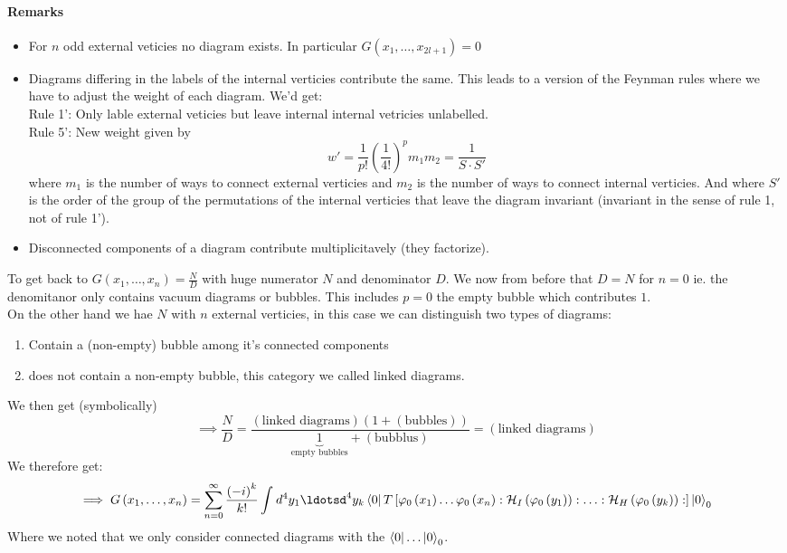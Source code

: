 \documentclass{report}
\begin{document}
\paragraph{Remarks}
\begin{itemize}
  \item For $n$ odd external veticies no diagram exists. In particular $G\left( x_1,\ldots,x_{2l+1}  \right) = 0$ 
  \item Diagrams differing in the labels of the internal verticies contribute the same. This leads to a version of the Feynman rules where we have to adjust the weight of each diagram. We'd get:\\
    Rule 1': Only lable external veticies but leave internal internal vetricies unlabelled.\\
    Rule 5': New weight given by \[
    w' = \frac{1}{p!} \left( \frac{1}{4!} \right) ^{p} m_1m_2 = \frac{1}{S \cdot S'} 
  \] where $m_1$ is the number of ways to connect external verticies and $m_2$ is the number of ways to connect internal verticies. And where $S'$ is the order of the group of the permutations of the internal verticies that leave the diagram invariant (invariant in the sense of rule 1, not of rule 1').
  \item Disconnected components of a diagram contribute multiplicitavely (they factorize).
\end{itemize}
To get back to $G\left( x_1,\ldots,x_n \right) = \frac{N}{D} $ with huge numerator $N$ and denominator $D$. We now from before that $D = N$ for $n = 0$ ie. the denomitanor only contains vacuum diagrams or bubbles. This includes $p = 0$ the empty bubble which contributes $1$.\\
On the other hand we hae $N$ with $n$ external verticies, in this case we can distinguish two types of diagrams:
\begin{enumerate}
  \item Contain a (non-empty) bubble among it's connected components
  \item does not contain a non-empty bubble, this category we called linked diagrams.
\end{enumerate}
We then get (symbolically) \[
  \implies \frac{N}{D} = \frac{(\text{linked diagrams}) ( 1+ ( \text{bubbles} ) )}{\underbrace{1}_{\text{empty bubbles}} + \left( \text{bubblus} \right) } = ( \text{linked diagrams} )
\] 
We therefore get: \[
  \implies G\left( x_1,\ldots,x_n \right) = \sum_{n=0}^{\infty} \frac{\left( -i \right) ^{k} }{k!} \int_{}^{} d^{4} y_1\ldotsd^{4} y_k \bra{0} T\left[ \varphi_0\left( x_1 \right) \ldots\varphi_0\left( x_n \right) :\mathcal{H}_I\left( \varphi_0\left( y_1 \right)  \right):\ldots:\mathcal{H}_H\left( \varphi_0\left( y_k \right)  \right):  \right]  \ket{0}_{0} 
\] 
Where we noted that we only consider connected diagrams with the $\bra{0} \ldots \ket{0}_0$.\\
\end{document}
